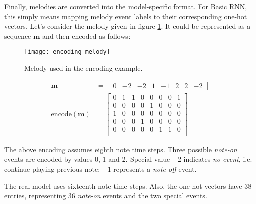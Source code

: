 \documentclass[../../report.tex]{subfiles}
\begin{document}
Finally, melodies are converted into the model-specific format. For Basic RNN,
this simply means mapping melody event labels to their corresponding one-hot
vectors. Let's consider the melody given in figure \ref{fig:encoding-melody}. It
could be represented as a sequence \(\bm{m}\) and then encoded as follows:

\begin{figure}[h]
  \centering
  \texttt{[image: encoding-melody]}
  \caption{Melody used in the encoding example.}
  \label{fig:encoding-melody}
\end{figure}

\begin{align*}
  \bm{m} &=
  \begin{bmatrix}
    0 & -2 & -2 & 1 & -1 & 2 & 2 & -2
  \end{bmatrix}
  \\
  \mathrm{encode}(\bm{m}) &=
  \begin{bmatrix}
    0 & 1 & 1 & 0 & 0 & 0 & 0 & 1 \\
    0 & 0 & 0 & 0 & 1 & 0 & 0 & 0 \\
    1 & 0 & 0 & 0 & 0 & 0 & 0 & 0 \\
    0 & 0 & 0 & 1 & 0 & 0 & 0 & 0 \\
    0 & 0 & 0 & 0 & 0 & 1 & 1 & 0 \\
  \end{bmatrix}
\end{align*}

The above encoding assumes eighth note time steps. Three possible \emph{note-on}
events are encoded by values 0, 1 and 2. Special value \num{-2} indicates
\emph{no-event}, i.e. continue playing previous note; \num{-1} represents a
\emph{note-off} event.

The real model uses sixteenth note time steps. Also, the one-hot vectors have 38
entries, representing 36 \emph{note-on} events and the two special events.
\end{document}
